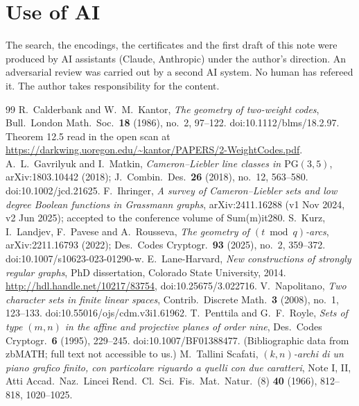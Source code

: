 \documentclass[11pt]{article}
\theoremstyle{plain}
\theoremstyle{remark}
\begin{document}
\section*{Use of AI}
The search, the encodings, the certificates and the first draft of this note were produced by AI assistants (Claude, Anthropic) under the author's direction.
An adversarial review was carried out by a second AI system.
No human has refereed it.
The author takes responsibility for the content.

{\footnotesize
\begin{thebibliography}{99}
\setlength{\itemsep}{1pt}
 R.~Calderbank and W.~M.~Kantor, \emph{The geometry of two-weight codes}, Bull.\ London Math.\ Soc.\ \textbf{18} (1986), no.~2, 97--122. doi:10.1112/blms/18.2.97. Theorem 12.5 read in the open scan at \url{https://darkwing.uoregon.edu/~kantor/PAPERS/2-WeightCodes.pdf}.
 A.~L.~Gavrilyuk and I.~Matkin, \emph{Cameron--Liebler line classes in $\mathrm{PG}(3,5)$}, arXiv:1803.10442 (2018); J.\ Combin.\ Des.\ \textbf{26} (2018), no.~12, 563--580. doi:10.1002/jcd.21625.
 F.~Ihringer, \emph{A survey of Cameron--Liebler sets and low degree Boolean functions in Grassmann graphs}, arXiv:2411.16288 (v1 Nov 2024, v2 Jun 2025); accepted to the conference volume of Sum(m)it280.
 S.~Kurz, I.~Landjev, F.~Pavese and A.~Rousseva, \emph{The geometry of $(t \bmod q)$-arcs}, arXiv:2211.16793 (2022); Des.\ Codes Cryptogr.\ \textbf{93} (2025), no.~2, 359--372. doi:10.1007/s10623-023-01290-w.
 E.~Lane-Harvard, \emph{New constructions of strongly regular graphs}, PhD dissertation, Colorado State University, 2014. \url{http://hdl.handle.net/10217/83754}, doi:10.25675/3.022716.
 V.~Napolitano, \emph{Two character sets in finite linear spaces}, Contrib.\ Discrete Math.\ \textbf{3} (2008), no.~1, 123--133. doi:10.55016/ojs/cdm.v3i1.61962. %
 T.~Penttila and G.~F.~Royle, \emph{Sets of type $(m,n)$ in the affine and projective planes of order nine}, Des.\ Codes Cryptogr.\ \textbf{6} (1995), 229--245. doi:10.1007/BF01388477. (Bibliographic data from zbMATH; full text not accessible to us.)
 M.~Tallini Scafati, \emph{$(k,n)$-archi di un piano grafico finito, con particolare riguardo a quelli con due caratteri}, Note I, II, Atti Accad.\ Naz.\ Lincei Rend.\ Cl.\ Sci.\ Fis.\ Mat.\ Natur.\ (8) \textbf{40} (1966), 812--818, 1020--1025. %

\end{thebibliography}}
\end{document}
